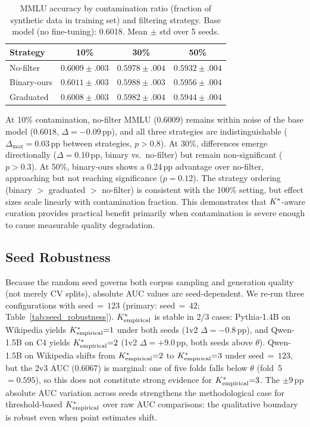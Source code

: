 \begin{table}[h]
\centering
\small
\caption{MMLU accuracy by contamination ratio (fraction of synthetic data in training set) and filtering strategy. Base model (no fine-tuning): 0.6018. Mean $\pm$ std over 5 seeds.}
\label{tab:dose_response}
\begin{tabular}{lccc}
\toprule
\textbf{Strategy} & \textbf{10\%} & \textbf{30\%} & \textbf{50\%} \\
\midrule
No-filter   & $0.6009 \pm .003$ & $0.5978 \pm .004$ & $0.5932 \pm .004$ \\
Binary-ours & $0.6011 \pm .003$ & $0.5988 \pm .003$ & $0.5956 \pm .004$ \\
Graduated   & $0.6008 \pm .003$ & $0.5982 \pm .004$ & $0.5944 \pm .004$ \\
\bottomrule
\end{tabular}
\end{table}

At 10\% contamination, no-filter MMLU ($0.6009$) remains within noise of the base model ($0.6018$, $\Delta = -0.09$\,pp), and all three strategies are indistinguishable ($\Delta_{\max} = 0.03$\,pp between strategies, $p > 0.8$).
At 30\%, differences emerge directionally ($\Delta = 0.10$\,pp, binary vs.\ no-filter) but remain non-significant ($p > 0.3$).
At 50\%, binary-ours shows a 0.24\,pp advantage over no-filter, approaching but not reaching significance ($p = 0.12$).
The strategy ordering (binary $>$ graduated $>$ no-filter) is consistent with the 100\% setting, but effect sizes scale linearly with contamination fraction.
This demonstrates that ${K^*}$-aware curation provides practical benefit primarily when contamination is severe enough to cause measurable quality degradation.

\subsection{Seed Robustness}
\label{sec:seed_robustness}

Because the random seed governs both corpus sampling and generation quality (not merely CV splits), absolute AUC values are seed-dependent.
We re-run three configurations with seed$\,{=}\,123$ (primary: seed$\,{=}\,42$; Table~\ref{tab:seed_robustness}).
${K^*_{\text{empirical}}}$ is stable in 2/3 cases: Pythia-1.4B on Wikipedia yields ${K^*_{\text{empirical}}}{=}1$ under both seeds (1v2 $\Delta = -0.8$\,pp), and Qwen-1.5B on C4 yields ${K^*_{\text{empirical}}}{=}2$ (1v2 $\Delta = +9.0$\,pp, both seeds above $\theta$).
Qwen-1.5B on Wikipedia shifts from ${K^*_{\text{empirical}}}{=}2$ to ${K^*_{\text{empirical}}}{=}3$ under seed$\,{=}\,123$, but the 2v3 AUC ($0.6067$) is marginal: one of five folds falls below $\theta$ (fold~5 $= 0.595$), so this does not constitute strong evidence for ${K^*_{\text{empirical}}}{=}3$.
The ${\pm}9$\,pp absolute AUC variation across seeds strengthens the methodological case for threshold-based ${K^*_{\text{empirical}}}$ over raw AUC comparisons: the qualitative boundary is robust even when point estimates shift.

